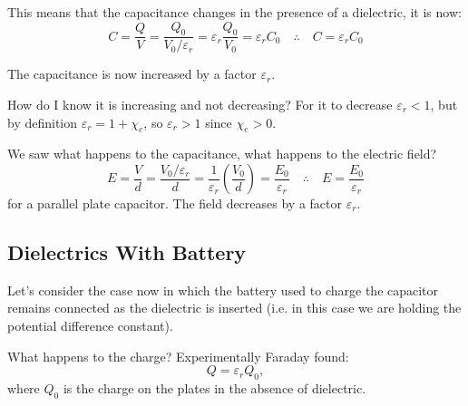 \vspace{0.8em}
This means that the capacitance changes in the presence of a dielectric, it is now:
\begin{equation*}
    C = \frac{Q}{V} = \frac{Q_0}{V_0/\varepsilon_r} = \varepsilon_r \frac{Q_0}{V_0} = \varepsilon_r C_0 \quad \therefore \quad \boxed{C = \varepsilon_r C_0}
\end{equation*}

The capacitance is now increased by a factor $\varepsilon_r$.

How do I know it is increasing and not decreasing? For it to decrease $\varepsilon_r < 1$, but by definition $\varepsilon_r = 1 + \chi_e$, so $\varepsilon_r > 1$ since $\chi_e > 0$.

We saw what happens to the capacitance, what happens to the electric field?
\begin{equation*}
    E = \frac{V}{d} = \frac{V_0/\varepsilon_r}{d} = \frac{1}{\varepsilon_r}\left(\frac{V_0}{d}\right) = \frac{E_0}{\varepsilon_r} \quad \therefore \quad \boxed{E = \frac{E_0}{\varepsilon_r}}
\end{equation*}
for a parallel plate capacitor. The field decreases by a factor $\varepsilon_r$.

\subsection{Dielectrics With Battery}

Let's consider the case now in which the battery used to charge the capacitor remains connected as the dielectric is inserted (i.e. in this case we are holding the potential difference constant).

What happens to the charge? Experimentally Faraday found:
\begin{equation}
    Q = \varepsilon_r Q_0,
\end{equation}
where $Q_0$ is the charge on the plates in the absence of dielectric.

